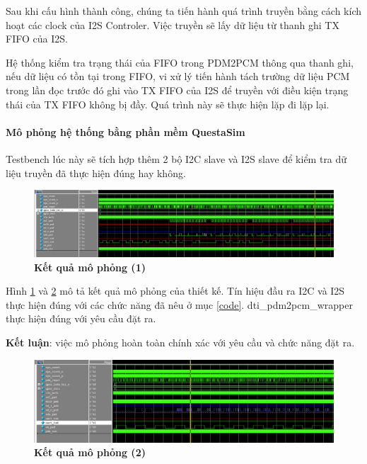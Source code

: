 Sau khi cấu hình thành công, chúng ta tiến hành quá trình truyền bằng cách kích hoạt các clock của I2S Controler. Việc truyền sẽ lấy dữ liệu từ thanh ghi TX FIFO của I2S.

Hệ thống kiểm tra trạng thái của FIFO trong PDM2PCM thông qua thanh ghi, nếu dữ liệu có tồn tại trong FIFO, vi xử lý tiến hành tách trường dữ liệu PCM trong lần đọc trước đó ghi vào TX FIFO của I2S để truyền với điều kiện trạng thái của TX FIFO không bị đầy. Quá trình này sẽ thực hiện lặp đi lặp lại.

\paragraph{Mô phỏng hệ thống bằng phần mềm QuestaSim}

Testbench lúc này sẽ tích hợp thêm 2 bộ I2C slave và I2S slave để kiểm tra dữ liệu truyền đã thực hiện đúng hay không. 
\begin{figure}[H]
    \centering
    \includegraphics[width=15cm]{Images/Chuong5/fpga/sim_1.png}
    \caption[Kết quả mô phỏng (1)]{\bfseries \fontsize{12pt}{0pt}\selectfont Kết quả mô phỏng (1)}
    \label{sim_1}
\end{figure}
Hình \ref{sim_1} và \ref{sim_2} mô tả kết quả mô phỏng của thiết kế. Tín hiệu đầu ra I2C và I2S thực hiện đúng với các chức năng đã nêu ở mục \ref{code}. dti\_pdm2pcm\_wrapper thực hiện đúng với yêu cầu đặt ra.

\textbf{Kết luận}: việc mô phỏng hoàn toàn chính xác với yêu cầu và chức năng đặt ra.

\begin{figure}[H]
    \centering
    \includegraphics[width=15cm]{Images/Chuong5/fpga/sim_2.png}
    \caption[Kết quả mô phỏng (2)]{\bfseries \fontsize{12pt}{0pt}\selectfont Kết quả mô phỏng (2)}
    \label{sim_2}
\end{figure}


